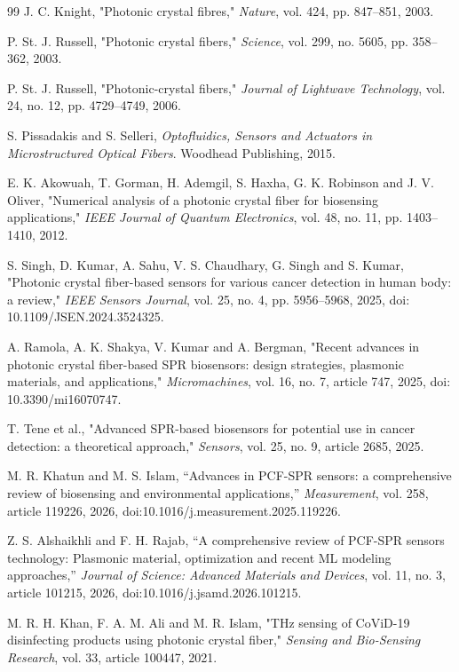 \documentclass[5p,times,twocolumn]{elsarticle}
\begin{document}
\begin{thebibliography}{99}
 J. C. Knight, "Photonic crystal fibres," \textit{Nature}, vol. 424, pp. 847--851, 2003.

 P. St. J. Russell, "Photonic crystal fibers," \textit{Science}, vol. 299, no. 5605, pp. 358--362, 2003.

 P. St. J. Russell, "Photonic-crystal fibers," \textit{Journal of Lightwave Technology}, vol. 24, no. 12, pp. 4729--4749, 2006.

 S. Pissadakis and S. Selleri, \textit{Optofluidics, Sensors and Actuators in Microstructured Optical Fibers}. Woodhead Publishing, 2015.

 E. K. Akowuah, T. Gorman, H. Ademgil, S. Haxha, G. K. Robinson and J. V. Oliver, "Numerical analysis of a photonic crystal fiber for biosensing applications," \textit{IEEE Journal of Quantum Electronics}, vol. 48, no. 11, pp. 1403--1410, 2012.

 S. Singh, D. Kumar, A. Sahu, V. S. Chaudhary, G. Singh and S. Kumar, "Photonic crystal fiber-based sensors for various cancer detection in human body: a review," \textit{IEEE Sensors Journal}, vol. 25, no. 4, pp. 5956--5968, 2025, doi: 10.1109/JSEN.2024.3524325.

 A. Ramola, A. K. Shakya, V. Kumar and A. Bergman, "Recent advances in photonic crystal fiber-based SPR biosensors: design strategies, plasmonic materials, and applications," \textit{Micromachines}, vol. 16, no. 7, article 747, 2025, doi: 10.3390/mi16070747.

 T. Tene et al., "Advanced SPR-based biosensors for potential use in cancer detection: a theoretical approach," \textit{Sensors}, vol. 25, no. 9, article 2685, 2025.

 M. R. Khatun and M. S. Islam, ``Advances in PCF-SPR sensors: a comprehensive review of biosensing and environmental applications,'' \textit{Measurement}, vol. 258, article 119226, 2026, doi:10.1016/j.measurement.2025.119226.

 Z. S. Alshaikhli and F. H. Rajab, ``A comprehensive review of PCF-SPR sensors technology: Plasmonic material, optimization and recent ML modeling approaches,'' \textit{Journal of Science: Advanced Materials and Devices}, vol. 11, no. 3, article 101215, 2026, doi:10.1016/j.jsamd.2026.101215.

 M. R. H. Khan, F. A. M. Ali and M. R. Islam, "THz sensing of CoViD-19 disinfecting products using photonic crystal fiber," \textit{Sensing and Bio-Sensing Research}, vol. 33, article 100447, 2021.


\end{thebibliography}
\end{document}
